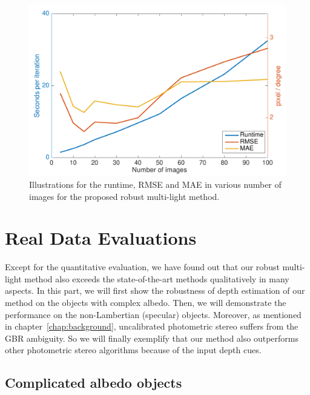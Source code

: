 \begin{figure}[!htbp]
    \centering
    \includegraphics[height = 0.6\linewidth]{figures/result/runtime.pdf} 
    \caption{Illustrations for the runtime, RMSE and MAE in various number of images for the proposed robust multi-light method.}
\label{fig:result_runtime}
\end{figure}


\section{Real Data Evaluations}
Except for the quantitative evaluation, we have found out that our robust multi-light method also exceeds the state-of-the-art methods qualitatively in many aspects.
In this part, we will first show the robustness of depth estimation of our method on the objects with complex albedo.
Then, we will demonstrate the performance on the non-Lambertian (specular) objects.
Moreover, as mentioned in chapter~\ref{chap:background}, uncalibrated photometric stereo suffers from the GBR ambiguity.
So we will finally exemplify that our method also outperforms other photometric stereo algorithms because of the input depth cues.

\subsection{Complicated albedo objects}

